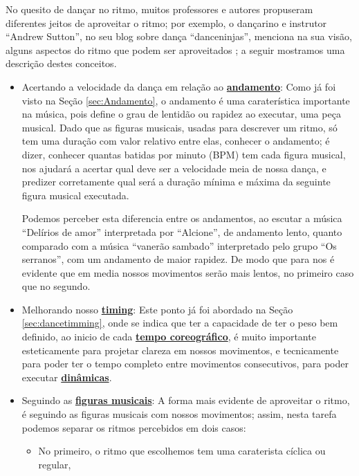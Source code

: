 No quesito de dançar no ritmo, muitos professores e autores propuseram diferentes jeitos de aproveitar o ritmo; 
por exemplo, o dançarino e instrutor ``Andrew Sutton'', 
no seu blog sobre dança ``danceninjas'',
menciona na sua visão, alguns aspectos do ritmo que podem ser aproveitados \cite{AndrewSuttonRitmo1};
a seguir mostramos uma descrição destes conceitos.  
\begin{itemize}
\item Acertando a velocidade da dança em relação ao \hyperref[sec:Andamento]{\textbf{andamento}}:
Como já foi visto na Seção \ref{sec:Andamento},
o andamento é uma caraterística importante na música,
pois define o grau de lentidão ou rapidez ao executar,
uma peça musical. 
Dado que as figuras musicais, usadas para descrever um ritmo, 
só tem uma duração com valor relativo entre elas,
conhecer o andamento; é dizer, conhecer quantas batidas por minuto (BPM) tem cada figura musical,
nos ajudará a acertar qual deve ser a velocidade meia de nossa dança,
e predizer corretamente qual será a duração mínima e máxima da seguinte figura musical executada.
\begin{example}
Podemos perceber esta diferencia entre os andamentos, 
ao escutar a música ``Delírios de amor'' interpretada por ``Alcione'', 
de andamento lento, 
quanto comparado com a música ``vanerão sambado'' interpretado pelo grupo ``Os serranos'', 
com um andamento de maior rapidez.
De modo que para nos é evidente que em media nossos movimentos serão mais lentos,
no primeiro caso que no segundo.
\end{example}
\item Melhorando nosso \hyperref[sec:dancetimming]{\textbf{timing}}:
Este ponto já foi abordado na Seção \ref{sec:dancetimming},
onde se indica que ter a capacidade de ter o peso bem definido,
ao inicio de cada \hyperref[sec:TemposCoreograficos]{\textbf{tempo coreográfico}}, 
é muito importante esteticamente para projetar clareza em nossos movimentos,
e tecnicamente para poder ter o tempo completo entre movimentos consecutivos,
para poder executar \hyperref[sec:musicalidade:dinamicas]{\textbf{dinâmicas}}.
\item Seguindo as \hyperref[sec:figurasmusicais]{\textbf{figuras musicais}}:
A forma mais evidente de aproveitar o ritmo, 
é seguindo as figuras musicais com nossos movimentos;
assim, nesta tarefa podemos separar os ritmos percebidos em dois casos:
\begin{itemize} 
\item No primeiro, o ritmo que escolhemos tem uma caraterista cíclica ou regular,

\end{itemize}
\end{itemize}
